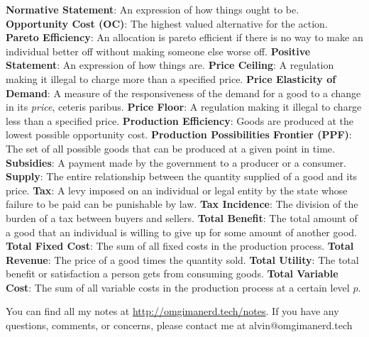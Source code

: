 \documentclass{article}
\begin{document}
\newline
\textbf{Normative Statement}: An expression of how things ought to be.
\newline
\textbf{Opportunity Cost (OC)}: The highest valued alternative for the action.
\newline
\textbf{Pareto Efficiency}: An allocation is pareto efficient if there is no
way to make an individual better off without making someone else worse off.
\newline
\textbf{Positive Statement}: An expression of how things are.
\newline
\textbf{Price Ceiling}: A regulation making it illegal to charge more than
a specified price.
\newline
\textbf{Price Elasticity of Demand}: A measure of the responsiveness of the
demand for a good to a change in its \textit{price}, ceteris paribus.
\newline
\textbf{Price Floor}: A regulation making it illegal to charge less than
a specified price.
\newline
\textbf{Production Efficiency}: Goods are produced at the lowest possible
opportunity cost.
\newline
\textbf{Production Possibilities Frontier (PPF)}: The set of all possible goods
that can be produced at a given point in time.
\newline
\textbf{Subsidies}: A payment made by the government to a producer or a
consumer.
\newline
\textbf{Supply}: The entire relationship between the quantity supplied of a
good and its price.
\newline
\textbf{Tax}: A levy imposed on an individual or legal entity by the state
whose failure to be paid can be punishable by law.
\newline
\textbf{Tax Incidence}: The division of the burden of a tax between buyers and
sellers.
\newline
\textbf{Total Benefit}: The total amount of a good that an individual is
willing to give up for some amount of another good.
\newline
\textbf{Total Fixed Cost}: The sum of all fixed costs in the production
process.
\newline
\textbf{Total Revenue}: The price of a good times the quantity sold.
\newline
\textbf{Total Utility}: The total benefit or satisfaction a person gets from
consuming goods.
\newline
\textbf{Total Variable Cost}: The sum of all variable costs in the production
process at a certain level \( p \).

\begin{center}
  You can find all my notes at \url{http://omgimanerd.tech/notes}. If you have
  any questions, comments, or concerns, please contact me at
  alvin@omgimanerd.tech
\end{center}
\end{document}
